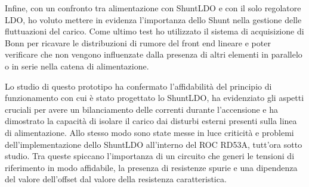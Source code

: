 Infine, con un confronto tra alimentazione con ShuntLDO e con il solo regolatore LDO, ho voluto mettere in evidenza l'importanza dello Shunt nella gestione delle fluttuazioni del carico. 
Come ultimo test ho utilizzato il sistema di acquisizione di Bonn per ricavare le distribuzioni di rumore del front end lineare e poter verificare che non vengono influenzate dalla presenza di altri elementi in parallelo o in serie nella catena di alimentazione. 

Lo studio di questo prototipo ha confermato l'affidabilità del principio di funzionamento con cui è stato progettato lo ShuntLDO, ha evidenziato gli aspetti cruciali per avere un bilanciamento delle correnti durante l'accensione e ha dimostrato la capacità di isolare il carico dai disturbi esterni presenti sulla linea di alimentazione.
Allo stesso modo sono state messe in luce criticità e problemi dell'implementazione dello ShuntLDO all'interno del ROC RD53A, tutt'ora sotto studio. Tra queste spiccano l'importanza di un circuito che generi le tensioni di riferimento in modo affidabile, la presenza di resistenze spurie e una dipendenza del valore dell'offset dal valore della resistenza caratteristica. 





